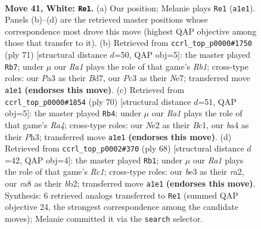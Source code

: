 \documentclass[11pt]{article}
\begin{document}
\clearpage

\begin{figure}[p]\centering
\begin{subfigure}{0.46\textwidth}\centering
\resizebox{\linewidth}{!}{%
\newchessgame
\chessboard[
  setfen={r6k/4n3/8/pp6/b1p3P1/P1P1bN2/1B2N1K1/R7 w - - 6 41},
  showmover=false,
  pgfstyle=straightmove, color=movearrow, markmove={a1-e1}
]}
\caption{}
\end{subfigure}\hfill
\begin{subfigure}{0.46\textwidth}\centering
\resizebox{\linewidth}{!}{%
\newchessgame
\chessboard[
  setfen={1r6/3bnk1p/5p2/1p1p4/3N1P2/6P1/R4K1P/1B6 b - - 5 36},
  showmover=false,
  pgfstyle=straightmove, color=movearrow, markmove={b8-b7}
]}
\caption{}
\end{subfigure}
\\[4pt]
\begin{subfigure}{0.46\textwidth}\centering
\resizebox{\linewidth}{!}{%
\newchessgame
\chessboard[
  setfen={2r3k1/6p1/5p2/8/R1p2P1p/2Pb3P/1P3KP1/2B5 w - - 1 36},
  showmover=false,
  pgfstyle=straightmove, color=movearrow, markmove={a4-b4}
]}
\caption{}
\end{subfigure}\hfill
\begin{subfigure}{0.46\textwidth}\centering
\resizebox{\linewidth}{!}{%
\newchessgame
\chessboard[
  setfen={8/5p1k/1N4p1/7p/7P/4BbP1/rb3P2/2R3K1 w - - 15 35},
  showmover=false,
  pgfstyle=straightmove, color=movearrow, markmove={c1-b1}
]}
\caption{}
\end{subfigure}
\caption{\textbf{Move 41, White: \texttt{Re1}.} (a) Our position; Melanie plays \texttt{Re1} (\texttt{a1e1}). Panels (b)--(d) are the retrieved master positions whose correspondence most drove this move (highest QAP objective among those that transfer to it). (b) Retrieved from \texttt{ccrl\_top\_p0000\#1750} (ply 71) [structural distance $d$=50, QAP obj=5]: the master played \texttt{Rb7}; under $\mu$ our \emph{Ra1} plays the role of that game's \emph{Rb1}; cross-type roles: our \emph{P}a3 as their \emph{B}d7, our \emph{P}c3 as their \emph{N}e7; transferred move \texttt{a1e1} \textbf{(endorses this move)}. (c) Retrieved from \texttt{ccrl\_top\_p0000\#1854} (ply 70) [structural distance $d$=51, QAP obj=5]: the master played \texttt{Rb4}; under $\mu$ our \emph{Ra1} plays the role of that game's \emph{Ra4}; cross-type roles: our \emph{N}e2 as their \emph{B}c1, our \emph{b}a4 as their \emph{P}h3; transferred move \texttt{a1e1} \textbf{(endorses this move)}. (d) Retrieved from \texttt{ccrl\_top\_p0002\#370} (ply 68) [structural distance $d$=42, QAP obj=4]: the master played \texttt{Rb1}; under $\mu$ our \emph{Ra1} plays the role of that game's \emph{Rc1}; cross-type roles: our \emph{b}e3 as their \emph{r}a2, our \emph{r}a8 as their \emph{b}b2; transferred move \texttt{a1e1} \textbf{(endorses this move)}. Synthesis: 6 retrieved analogs transferred to \texttt{Re1} (summed QAP objective 24, the strongest correspondence among the candidate moves); Melanie committed it via the \texttt{search} selector.}
\label{fig:thought-m80}
\end{figure}
\end{document}

